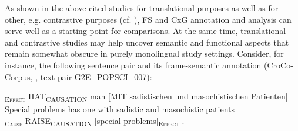 \documentclass[output=paper]{LSP/langsci}
\begin{document}
As shown in the above-cited studies for translational purposes as well as for other, e.g. contrastive purposes (cf. \citealt{Boas2010}), FS and CxG annotation and analysis can serve well as a starting point for comparisons. At the same time, translational and contrastive studies may help uncover semantic and functional aspects that remain somewhat obscure in purely monolingual study settings. Consider, for instance, the following sentence pair and its frame-semantic annotation (CroCo-Corpus, \citealt{HansenSchirra2012Cross}, text pair G2E\_POPSCI\_007):

\ea\label{czulo:ex:9}
\textsc{\textsubscript{Effect}} HAT\textsubscript{CAUSATION} man [MIT sadistischen und masochistischen Patienten] \\
Special problems has one with sadistic and masochistic patients \\
\textsc{\textsubscript{Cause}} RAISE\textsubscript{CAUSATION} [special problems]\textsc{\textsubscript{Effect}} .
\z
\end{document}
